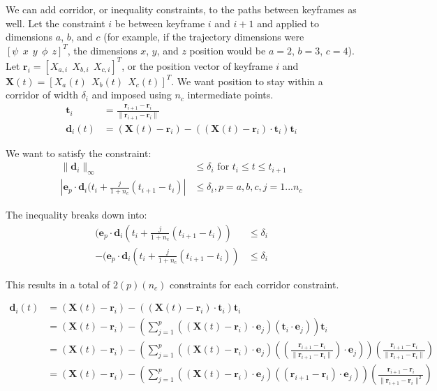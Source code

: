\documentclass[11pt]{article}
\begin{document}
We can add corridor, or inequality constraints, to the paths between keyframes as well. Let the constraint $i$ be between keyframe $i$ and $i+1$ and applied to dimensions $a$, $b$, and $c$ (for example, if the trajectory dimensions were $[\psi \ \ x \ \ y \ \ \phi \ \ z]^T$, the dimensions $x$, $y$, and $z$ position would be $a = 2$, $b=3$, $c=4$). Let $\mathbf{r}_i = [X_{a, i} \ \ X_{b, i} \ \ X_{c, i}]^T$, or the position vector of keyframe $i$ and $\mathbf{X} (t) = [X_a (t) \ \ X_b (t) \ \ X_{c}(t)]^T$. We want position to stay within a corridor of width $\delta_i$ and imposed using $n_c$ intermediate points. 
\begin{align*}
\mathbf{t}_i &= \frac{ \mathbf{r}_{i+1} - \mathbf{r}_i } { \| \mathbf{r}_{i+1} - \mathbf{r}_i \| } \\
\mathbf{d}_i (t) &= (\mathbf{X}(t) - \mathbf{r}_i) - ((\mathbf{X}(t) - \mathbf{r}_i) \cdot \mathbf{t}_i) \mathbf{t}_i
\end{align*}

We want to satisfy the constraint:
\begin{align*}
\| \mathbf{d}_i \|_{\infty} & \le \delta_i \text{ for } t_i \le t \le t_{i+1} \\
| \mathbf{e}_p \cdot \mathbf{d}_i (t_i + \frac{j}{1+n_c} (t_{i+1} - t_i) | & \le \delta_i ,  p = a, b, c, j = 1 ... n_c 
\end{align*}

The inequality breaks down into: 
\begin{align*}
(\mathbf{e}_p \cdot \mathbf{d}_i (t_i + \frac{j}{1+n_c} (t_{i+1} - t_i) ) & \le \delta_i \\
- (\mathbf{e}_p \cdot \mathbf{d}_i (t_i + \frac{j}{1+n_c} (t_{i+1} - t_i) ) & \le \delta_i 
\end{align*}

This results in a total of $2(p)(n_c)$ constraints for each corridor constraint. 

\begin{align*}
\mathbf{d}_i (t) &= (\mathbf{X}(t) - \mathbf{r}_i) - ((\mathbf{X}(t) - \mathbf{r}_i) \cdot \mathbf{t}_i) \mathbf{t}_i \\
&= (\mathbf{X}(t) - \mathbf{r}_i) - \left( \sum_{j = 1}^{p} {((\mathbf{X}(t) - \mathbf{r}_i) \cdot \mathbf{e}_j)(\mathbf{t}_i \cdot \mathbf{e}_j)} \right) \mathbf{t}_i \\ 
&= (\mathbf{X}(t) - \mathbf{r}_i) - \left( \sum_{j = 1}^{p}  {((\mathbf{X}(t) - \mathbf{r}_i) \cdot \mathbf{e}_j)((\frac{ \mathbf{r}_{i+1} - \mathbf{r}_i } { \| \mathbf{r}_{i+1} - \mathbf{r}_i \| }) \cdot \mathbf{e}_j)} \right) (\frac{ \mathbf{r}_{i+1} - \mathbf{r}_i } { \| \mathbf{r}_{i+1} - \mathbf{r}_i \| }) \\ 
&= (\mathbf{X}(t) - \mathbf{r}_i) - \left( \sum_{j = 1}^{p}  {((\mathbf{X}(t) - \mathbf{r}_i) \cdot \mathbf{e}_j)(( \mathbf{r}_{i+1} - \mathbf{r}_i ) \cdot \mathbf{e}_j)} \right) (\frac{ \mathbf{r}_{i+1} - \mathbf{r}_i } { \| \mathbf{r}_{i+1} - \mathbf{r}_i \|^2 }) \\ 
\end{align*}
\end{document}
